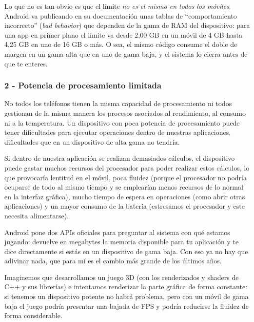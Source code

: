 Lo que no es tan obvio es que el límite \emph{no es el mismo en todos los móviles}. Android va publicando en su documentación unas tablas de \enquote{comportamiento incorrecto} (\emph{bad behavior}) que dependen de la gama de RAM del dispositivo: para una app en primer plano el límite va desde 2,00 GB en un móvil de 4 GB hasta 4,25 GB en uno de 16 GB o más. O sea, el mismo código consume el doble de margen en un gama alta que en uno de gama baja, y el sistema lo cierra antes de que te enteres.

\subsubsection*{2 - Potencia de procesamiento limitada}

No todos los teléfonos tienen la misma capacidad de procesamiento ni todos gestionan de la misma manera los procesos asociados al rendimiento, al consumo ni a la temperatura. Un dispositivo con poca potencia de procesamiento puede tener dificultades para ejecutar operaciones dentro de nuestras aplicaciones, dificultades que en un dispositivo de alta gama no tendría.

Si dentro de nuestra aplicación se realizan demasiados cálculos, el dispositivo puede gastar muchos recursos del procesador para poder realizar estos cálculos, lo que provocaría lentitud en el móvil, poca fluidez (porque el procesador no podría ocuparse de todo al mismo tiempo y se emplearían menos recursos de lo normal en la interfaz gráfica), mucho tiempo de espera en operaciones (como abrir otras aplicaciones) y un mayor consumo de la batería (estresamos el procesador y este necesita alimentarse).

Android pone dos APIs oficiales para preguntar al sistema con qué estamos jugando:  devuelve en megabytes la memoria disponible para tu aplicación y  te dice directamente si estás en un dispositivo de gama baja. Con eso ya no hay que adivinar nada, que para mí es el cambio más grande de los últimos años.

Imaginemos que desarrollamos un juego 3D (con los renderizados y shaders de C++ y sus librerías) e intentamos renderizar la parte gráfica de forma constante: si tenemos un dispositivo potente no habrá problema, pero con un móvil de gama baja el juego podría presentar una bajada de FPS y podría reducirse la fluidez de forma considerable.

